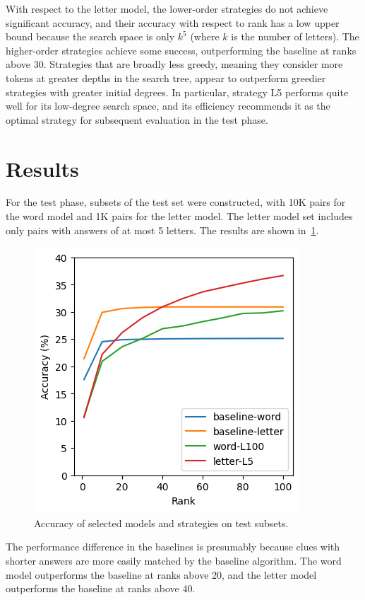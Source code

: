 \documentclass[letterpaper]{article} %
\begin{document}
\begin{NoHyper}
With respect to the letter model, the lower-order strategies do not achieve significant accuracy, and their accuracy with respect to rank has a low upper bound because the search space is only $k^5$ (where $k$ is the number of letters).
The higher-order strategies achieve some success,  outperforming the baseline at ranks above 30.
Strategies that are broadly less greedy, meaning they consider more tokens at greater depths in the search tree, appear to outperform greedier strategies with greater initial degrees.
In particular, strategy L5 performs quite well for its low-degree search space, and its efficiency recommends it as the optimal strategy for subsequent evaluation in the test phase.

\section{Results}
\label{sec:results}

For the test phase, subsets of the test set were constructed, with 10K pairs
for the word model and 1K pairs for the letter model.
The letter model set includes only pairs with answers of at most 5 letters.
The results are shown in~\ref{fig:test-acc}.

\begin{figure}
\centering
\includegraphics[width=0.75\columnwidth]{fig-test-acc}
\caption{Accuracy of selected models and strategies on test subsets.}
\label{fig:test-acc}
\end{figure}

The performance difference in the baselines is presumably because clues with
shorter answers are more easily matched by the baseline algorithm.
The word model outperforms the baseline at ranks above 20, and the letter model
outperforms the baseline at ranks above 40.


\end{NoHyper}
\end{document}
